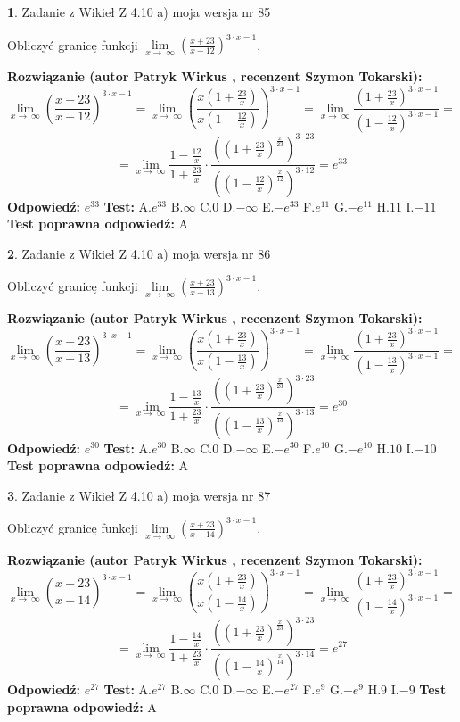 \documentclass[12pt, a4paper]{article}
\theoremstyle{definition} %
\newtheorem{zad}{}
\newcommand{\zadStart}[1]{\begin{zad}#1\newline}
\newcommand{\zadStop}{\end{zad}}
\newcommand{\rozwStart}[2]{\noindent \textbf{Rozwiązanie (autor #1 , recenzent #2): }\newline}
\newcommand{\rozwStop}{\newline}
\newcommand{\odpStart}{\noindent \textbf{Odpowiedź:}\newline}
\newcommand{\odpStop}{\newline}
\newcommand{\testStart}{\noindent \textbf{Test:}\newline}
\newcommand{\testStop}{\newline}
\newcommand{\kluczStart}{\noindent \textbf{Test poprawna odpowiedź:}\newline}
\newcommand{\kluczStop}{\newline}
\begin{document}
\zadStart{Zadanie z Wikieł Z 4.10 a) moja wersja nr 85}

Obliczyć granicę funkcji  $\lim\limits_{x\to\ \infty}(\frac{x+23}{x-12})^{3\cdot x-1}$.
\zadStop
\rozwStart{Patryk Wirkus}{Szymon Tokarski}
$$\lim\limits_{x\to\ \infty}(\frac{x+23}{x-12})^{3\cdot x-1} = \lim\limits_{x\to\ \infty}(\frac{x(1+\frac{23}{x})}{x(1-\frac{12}{x})})^{3\cdot x-1}=\lim\limits_{x\to\ \infty}\frac{(1+\frac{23}{x})^{3\cdot x-1}}{(1-\frac{12}{x})^{3\cdot x-1}}=$$
$$=\lim\limits_{x\to\ \infty}\frac{1-\frac{12}{x}}{1+\frac{23}{x}}\cdot\frac{((1+\frac{23}{x})^{\frac{x}{23}})^{3\cdot23}}{((1-\frac{12}{x})^{\frac{x}{12}})^{3\cdot12}}=e^{33}$$
\rozwStop
\odpStart
$e^{33}$
\odpStop
\testStart
A.$e^{33}$ B.$\infty$ C.$0$ D.$-\infty$ E.$-e^{33}$
F.$e^{11}$ G.$-e^{11}$
H.$11$
I.$-11$
\testStop
\kluczStart
A
\kluczStop



\zadStart{Zadanie z Wikieł Z 4.10 a) moja wersja nr 86}

Obliczyć granicę funkcji  $\lim\limits_{x\to\ \infty}(\frac{x+23}{x-13})^{3\cdot x-1}$.
\zadStop
\rozwStart{Patryk Wirkus}{Szymon Tokarski}
$$\lim\limits_{x\to\ \infty}(\frac{x+23}{x-13})^{3\cdot x-1} = \lim\limits_{x\to\ \infty}(\frac{x(1+\frac{23}{x})}{x(1-\frac{13}{x})})^{3\cdot x-1}=\lim\limits_{x\to\ \infty}\frac{(1+\frac{23}{x})^{3\cdot x-1}}{(1-\frac{13}{x})^{3\cdot x-1}}=$$
$$=\lim\limits_{x\to\ \infty}\frac{1-\frac{13}{x}}{1+\frac{23}{x}}\cdot\frac{((1+\frac{23}{x})^{\frac{x}{23}})^{3\cdot23}}{((1-\frac{13}{x})^{\frac{x}{13}})^{3\cdot13}}=e^{30}$$
\rozwStop
\odpStart
$e^{30}$
\odpStop
\testStart
A.$e^{30}$ B.$\infty$ C.$0$ D.$-\infty$ E.$-e^{30}$
F.$e^{10}$ G.$-e^{10}$
H.$10$
I.$-10$
\testStop
\kluczStart
A
\kluczStop



\zadStart{Zadanie z Wikieł Z 4.10 a) moja wersja nr 87}

Obliczyć granicę funkcji  $\lim\limits_{x\to\ \infty}(\frac{x+23}{x-14})^{3\cdot x-1}$.
\zadStop
\rozwStart{Patryk Wirkus}{Szymon Tokarski}
$$\lim\limits_{x\to\ \infty}(\frac{x+23}{x-14})^{3\cdot x-1} = \lim\limits_{x\to\ \infty}(\frac{x(1+\frac{23}{x})}{x(1-\frac{14}{x})})^{3\cdot x-1}=\lim\limits_{x\to\ \infty}\frac{(1+\frac{23}{x})^{3\cdot x-1}}{(1-\frac{14}{x})^{3\cdot x-1}}=$$
$$=\lim\limits_{x\to\ \infty}\frac{1-\frac{14}{x}}{1+\frac{23}{x}}\cdot\frac{((1+\frac{23}{x})^{\frac{x}{23}})^{3\cdot23}}{((1-\frac{14}{x})^{\frac{x}{14}})^{3\cdot14}}=e^{27}$$
\rozwStop
\odpStart
$e^{27}$
\odpStop
\testStart
A.$e^{27}$ B.$\infty$ C.$0$ D.$-\infty$ E.$-e^{27}$
F.$e^{9}$ G.$-e^{9}$
H.$9$
I.$-9$
\testStop
\kluczStart
A
\kluczStop
\end{document}
